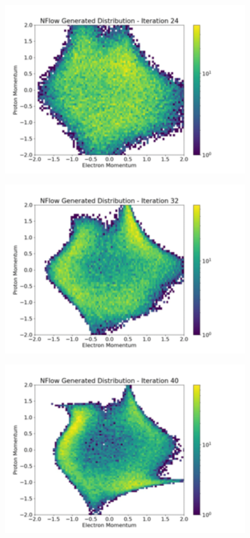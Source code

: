 \documentclass[aspectratio=169]{beamer}
\begin{document}
\begin{frame}[noframenumbering]\centering\includegraphics[width=0.8\textwidth]{images/400training/400training-3.png}\end{frame}
\begin{frame}[noframenumbering]\centering\includegraphics[width=0.8\textwidth]{images/400training/400training-4.png}\end{frame}
\begin{frame}[noframenumbering]\centering\includegraphics[width=0.8\textwidth]{images/400training/400training-5.png}\end{frame}
\end{document}
